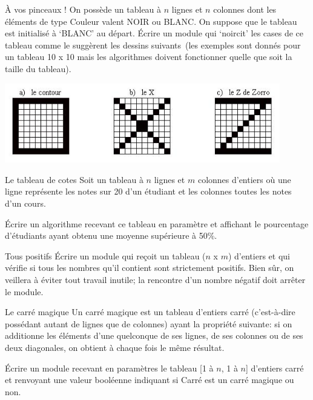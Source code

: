 \begin{Exercice}{À vos pinceaux !}
	On possède un tableau à $n$ lignes et $n$ colonnes dont les éléments de type
	Couleur valent NOIR ou BLANC. On suppose que le tableau est initialisé
	à ‘BLANC’ au départ. Écrire un module qui ‘noircit’ les cases de ce
	tableau comme le suggèrent les dessins suivants~(les exemples sont
	donnés pour un tableau 10 x 10 mais les algorithmes doivent fonctionner
	quelle que soit la taille du tableau).
	
	\begin{center}
	\includegraphics[width=0.9\textwidth]{image/tab2d-ex-oxz}
	\end{center}
\end{Exercice}

\begin{Exercice}{Le tableau de cotes}
	Soit un tableau à $n$ lignes et $m$ colonnes d'entiers où
	une ligne représente les notes sur 20 d'un étudiant et
	les colonnes toutes les notes d'un cours.
	
	Écrire un algorithme recevant ce tableau en paramètre et affichant le
	pourcentage d'étudiants ayant obtenu une moyenne
	supérieure à 50\%.
\end{Exercice}

\begin{Exercice}{Tous positifs}
	Écrire un module qui reçoit un tableau ($n$ x $m$) d’entiers et qui vérifie
	si tous les nombres qu’il contient sont strictement positifs. Bien sûr,
	on veillera à éviter tout travail inutile; la rencontre d’un nombre
	négatif doit arrêter le module.
\end{Exercice}

\begin{Exercice}{Le carré magique}
	Un carré magique est un tableau d’entiers carré
	(c'est-à-dire possédant autant de lignes que de
	colonnes) ayant la propriété suivante: si on additionne les éléments
	d'une quelconque de ses lignes, de ses colonnes ou de
	ses deux diagonales, on obtient à chaque fois le même résultat.

	Écrire un module recevant en paramètres le tableau [1 à $n$, 1 à $n$]
	d'entiers carré et renvoyant une valeur booléenne
	indiquant si Carré est un carré magique ou non.
\end{Exercice}

